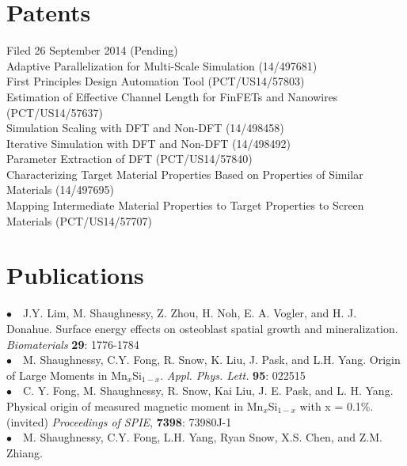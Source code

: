 \documentclass[11pt, a4paper]{article}
\newcommand{\years}[1]{\marginnote{\scriptsize #1}}
\begin{document}
{{\section*{{\color{mycolor4}\textbf{Patents}}}
\noindent
Filed 26 September 2014 (Pending) \\
\textbullet Adaptive Parallelization for Multi-Scale Simulation (14/497681) \\
\textbullet First Principles Design Automation Tool (PCT/US14/57803) \\
\textbullet Estimation of Effective Channel Length for FinFETs and Nanowires (PCT/US14/57637) \\
\textbullet Simulation Scaling with DFT and Non-DFT (14/498458) \\
\textbullet Iterative Simulation with DFT and Non-DFT (14/498492) \\
\textbullet Parameter Extraction of DFT (PCT/US14/57840) \\
\textbullet Characterizing Target Material Properties Based on Properties of Similar Materials (14/497695) \\
\textbullet Mapping Intermediate Material Properties to Target Properties to Screen Materials (PCT/US14/57707)\\




\section*{{\color{mycolor4}\textbf{Publications}}}
\noindent
\years{2008}$\bullet$\ \   J.Y. Lim, M. Shaughnessy, Z. Zhou, H. Noh, E. A. Vogler, and H. J. Donahue.  %
{Surface energy effects on osteoblast spatial growth and mineralization.} \emph{Biomaterials} \textbf{29}: 1776-1784\\  
\years{2009}$\bullet$\ \   M. Shaughnessy, C.Y. Fong, R. Snow, K. Liu, J. Pask, and L.H. Yang. %
{ Origin of Large Moments in Mn$_x$Si$_{1-x}$.}\emph { Appl. Phys. Lett.} \textbf{95}: 022515\\
\years{    }$\bullet$\ \   C. Y. Fong, M. Shaughnessy, R. Snow, Kai Liu, J. E. Pask, and L. H. Yang. %
{Physical origin of measured magnetic moment in Mn$_x$Si$_{1-x}$ with x = 0.1\%.} (invited) \emph{Proceedings of SPIE}, \textbf{7398}: 73980J-1\\
\years{2010}$\bullet$\ \   M. Shaughnessy, C.Y. Fong, L.H. Yang, Ryan Snow, X.S. Chen, and Z.M. Zhiang. %

}}
\end{document}
